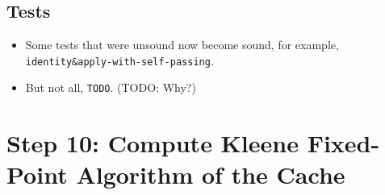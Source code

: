 \documentclass[12pt, oneside]{book}
\begin{document}
\subsection{Tests}

\begin{itemize}
  \item Some tests that were unsound now become sound, for example, \texttt{identity\&apply-with-self-passing}.
  \item But not all, \texttt{TODO}. (TODO: Why?)
\end{itemize}

\section{Step 10: Compute Kleene Fixed-Point Algorithm of the Cache}
\label{section-10--compute-kleene-fixed-point-algorithm-of-the-cache}
\end{document}
